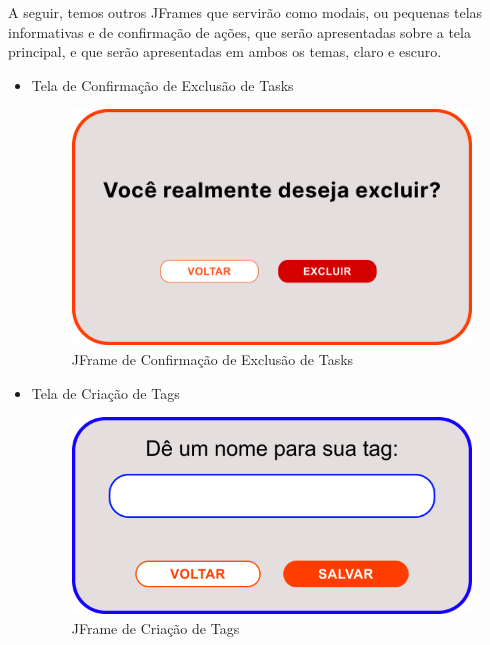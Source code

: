 \documentclass[a4paper,12pt]{article}
\begin{document}
A seguir, temos outros JFrames que servirão como modais, ou pequenas telas informativas e de confirmação de ações, que serão apresentadas sobre a 
tela principal, e que serão apresentadas em ambos os temas, claro e escuro.
\begin{itemize}
	\item Tela de Confirmação de Exclusão de Tasks
	\begin{figure}[H]
		\centering
		\includegraphics[scale=0.20]{prototypes/white/Modal Confirmation.png}
		\caption{JFrame de Confirmação de Exclusão de Tasks}
	\end{figure}

	\item Tela de Criação de Tags
	\begin{figure}[H]
		\centering
		\includegraphics[scale=0.20]{prototypes/white/Add Tag.png}
		\caption{JFrame de Criação de Tags}
	\end{figure}


\end{itemize}
\end{document}
